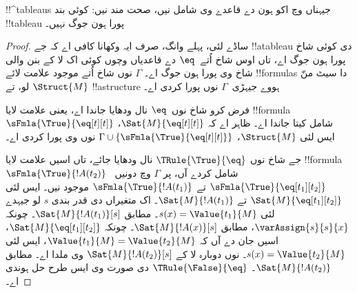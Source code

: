\documentclass[../../../include/open-logic-section]{subfiles}
\begin{document}


\begin{prop}
!!^{tableau}s جیہناں وچ اکو ہون دے قاعدے وی شامل نیں، صحت مند نیں:
کوئی بند !!{tableau} پورا ہون جوگ نہیں۔
\end{prop}

\begin{proof}
ساڈے لئی، پہلے وانگ، صرف ایہ وکھانا کافی اے کہ جے !!a{tableau} دی
کوئی شاخ پورا ہون جوگ اے، تاں اوس شاخ اُتے~$\eq$ دے قاعدیاں وچوں
کوئی اک لا کے بنن والی شاخ وی پورا ہون جوگ اے۔ $\Gamma$ نوں شاخ اُتے
موجود علامت لائے !!{formula}s دا سیٹ منّ لو، تے $\Struct{M}$
!!a{structure} ہووے جیہڑی~$\Gamma$ نوں پورا کردی اے۔

فرض کرو شاخ نوں~$\eq$ نال ودھایا جاندا اے، یعنی علامت لایا
!!{formula}~$\sFmla{\True}{\eq[t][t]}$ شامل کیتا جاندا اے۔
ظاہر اے کہ $\Sat{M}{\eq[t][t]}$، ایس لئی $\Struct{M}$،
$\Gamma \cup \{\sFmla{\True}{\eq[t][t]}\}$ نوں وی پورا کردی اے۔

جے شاخ نوں $\TRule{\True}{\eq}$ نال ودھایا جائے، تاں اسیں علامت لایا
!!{formula}~$\sFmla{\True}{!A(t_2)}$ شامل کردے آں، پر $\Gamma$ وچ
دونیں~$\sFmla{\True}{\eq[t_1][t_2]}$ تے $\sFmla{\True}{!A(t_1)}$
موجود نیں۔ ایس لئی $\Sat{M}{\eq[t_1][t_2]}$ تے
$\Sat{M}{!A(t_1)}$۔ اک متغیراں دی قدر بندی $s$ لو جیہدے لئی
$s(x) = \Value{t_1}{M}$۔ 
مطابق $\Sat{M}{!A(t_1)}[s]$۔ چونکہ $\varAssign{s}{s}{x}$،
 مطابق $\Sat{M}{!A(x)}[s]$۔
چونکہ $\Sat{M}{\eq[t_1][t_2]}$، اسیں جان دے آں کہ
$\Value{t_1}{M} = \Value{t_2}{M}$، ایس لئی
$s(x) = \Value{t_2}{M}$۔  نوں
دوبارہ لا کے $\Sat{M}{!A(t_2)}[s]$ وی ملدا اے۔
 مطابق
$\Sat{M}{!A(t_2)}$۔ $\TRule{\False}{\eq}$ دی صورت وی ایس طرح
حل ہوندی اے۔
\end{proof}
\end{document}
